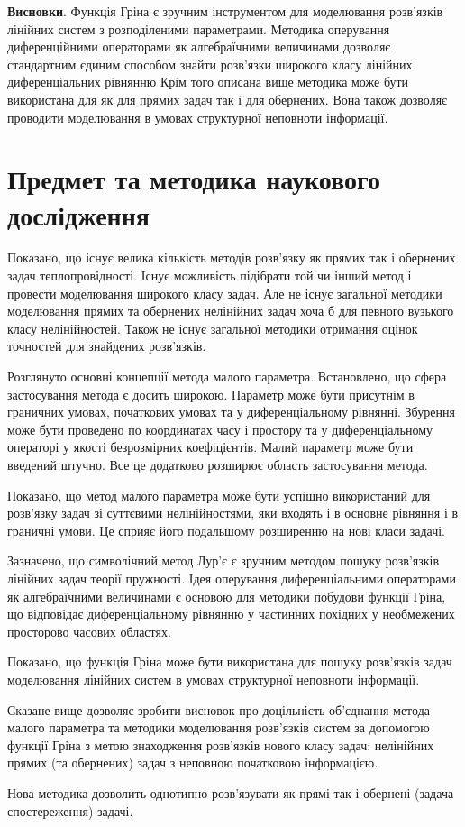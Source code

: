 \textbf{Висновки}. Функція Гріна є зручним інструментом для моделювання розв’язків лінійних систем з розподіленими
параметрами. Методика оперування диференційними операторами як алгебраїчними величинами дозволяє стандартним
єдиним способом знайти розв’язки широкого класу лінійних диференціальних рівнянню Крім того описана вище методика
може бути використана для як для прямих задач так і для обернених. Вона також дозволяє проводити моделювання в
умовах структурної неповноти інформації.

\section{Предмет та методика наукового дослідження} \label{sect1_4}

Показано, що існує велика кількість методів розв’язку як прямих так і обернених задач теплопровідності. Існує
можливість підібрати той чи інший метод  і провести моделювання широкого класу задач.  Але не існує загальної
методики моделювання прямих та обернених нелінійних задач хоча б для певного вузького класу нелінійностей. Також
не існує загальної методики отримання оцінок точностей для знайдених  розв’язків.

Розглянуто основні концепції метода малого параметра. Встановлено, що сфера застосування метода є досить широкою.
Параметр може бути присутнім в граничних умовах, початкових умовах та у диференціальному рівнянні. Збурення може
бути проведено по координатах часу і простору та у диференціальному операторі у якості безрозмірних коефіцієнтів.
Малий параметр може бути введений штучно. Все це додатково розширює область застосування метода.

Показано, що метод малого параметра може бути успішно використаний для розв’язку задач зі суттєвими нелінійностями,
яки входять і в основне рівняння і в граничні умови. Це сприяє його подальшому розширенню на нові класи задачі.

Зазначено, що символічний метод Лур’є є зручним методом пошуку розв’язків лінійних задач теорії пружності.
Ідея оперування диференціальними операторами як алгебраїчними величинами є основою для методики побудови функції
Гріна, що відповідає диференціальному рівнянню у частинних похідних у необмежених просторово часових областях.

Показано, що функція Гріна може бути використана для пошуку розв’язків задач моделювання лінійних систем в
умовах структурної неповноти інформації.

Сказане вище дозволяє зробити висновок про доцільність об’єднання  метода малого параметра та методики
моделювання розв’язків систем за допомогою функції Гріна з метою знаходження розв’язків нового класу задач:
нелінійних прямих (та обернених) задач з неповною початковою інформацією.

Нова методика дозволить однотипно розв’язувати як прямі так і обернені (задача спостереження) задачі.
